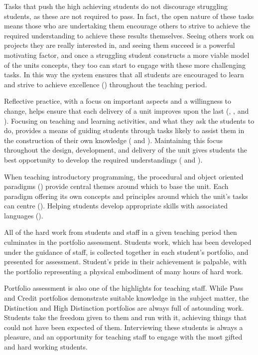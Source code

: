 Tasks that push the high achieving students do not discourage struggling students, as these are not required to pass. In fact, the open nature of these tasks means those who are undertaking them encourage others to strive to achieve the required understanding to achieve these results themselves. Seeing others work on projects they are really interested in, and seeing them succeed is a powerful motivating factor, and once a struggling student constructs a more viable model of the units concepts, they too can start to engage with these more challenging tasks. In this way the system ensures that all students are encouraged to learn and strive to achieve excellence () throughout the teaching period.   

Reflective practice, with a focus on important aspects and a willingness to change, helps ensure that each delivery of a unit improves upon the last (, , and ). Focusing on teaching and learning activities, and what they ask the students to do, provides a means of guiding students through tasks likely to assist them in the construction of their own knowledge ( and ). Maintaining this focus throughout the design, development, and delivery of the unit gives students the best opportunity to develop the required understandings ( and ).

When teaching introductory programming, the procedural and object oriented paradigms () provide central themes around which to base the unit. Each paradigm offering its own concepts and principles around which the unit's tasks can centre (). Helping students develop appropriate skills with associated languages ().

All of the hard work from students and staff in a given teaching period then culminates in the portfolio assessment. Students work, which has been developed under the guidance of staff, is collected together in each student's portfolio, and presented for assessment. Student's pride in their achievement is palpable, with the portfolio representing a physical embodiment of many hours of hard work.

Portfolio assessment is also one of the highlights for teaching staff. While Pass and Credit portfolios demonstrate suitable knowledge in the subject matter, the Distinction and High Distinction portfolios are always full of astounding work. Students take the freedom given to them and run with it, achieving things that could not have been expected of them. Interviewing these students is always a pleasure, and an opportunity for teaching staff to engage with the most gifted and hard working students.

